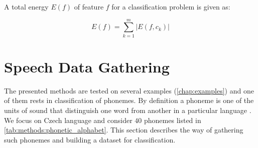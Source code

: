 A total energy $ E(f) $ of feature $ f $ for a classification problem is given as:

\begin{equation} \label{eq:feature_energy_total}
E(f) = \displaystyle{\sum_{k=1}^{m} | E(f,c_k)} |
\end{equation}

\newpage
\section{Speech Data Gathering} \label{sec:speech_data_gathering}
The presented methods are tested on several examples (\cref{chap:examples}) and one of them rests in classification of phonemes. By definition a phoneme is one of the units of sound that distinguish one word from another in a particular language \citep{wiki:mnist}. We focus on Czech language and consider $ 40 $ phonemes listed in \cref{tab:methods:phonetic_alphabet}. This section describes the way of gathering such phonemes and building a dataset for classification.

